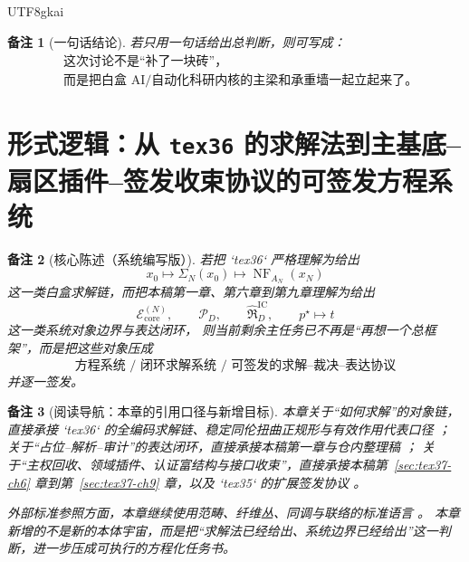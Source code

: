 \documentclass[12pt]{article}
\newtheorem{remark}{备注}[section]
\begin{document}
\begin{CJK*}{UTF8}{gkai}
\begin{remark}[一句话结论]
若只用一句话给出总判断，则可写成：
\[
  \boxed{
    \begin{aligned}
      &\text{这次讨论不是“补了一块砖”，}\\
      &\text{而是把白盒 AI/自动化科研内核的主梁和承重墙一起立起来了。}
    \end{aligned}
  }
\]
\end{remark}

\clearpage

\section{形式逻辑：从 \texttt{tex36} 的求解法到主基底--扇区插件--签发收束协议的可签发方程系统}
\label{sec:tex37-ch11}

\begin{remark}[核心陈述（系统编写版）]
若把 `tex36` 严格理解为给出
\[
  x_0\mapsto \Sigma_N(x_0)\mapsto \operatorname{NF}_{A_N}(x_N)
\]
这一类白盒求解链，而把本稿第一章、第六章到第九章理解为给出
\[
  \mathcal E_{\mathrm{core}}^{(N)},
  \qquad
  \mathcal P_D,
  \qquad
  \widehat{\mathfrak R}_D^{\mathrm{IC}},
  \qquad
  p^\star\mapsto t
\]
这一类系统对象边界与表达闭环，
则当前剩余主任务已不再是“再想一个总框架”，而是把这些对象压成
\[
  \boxed{
    \text{方程系统 / 闭环求解系统 / 可签发的求解--裁决--表达协议}
  }
\]
并逐一签发。
\end{remark}

\begin{remark}[阅读导航：本章的引用口径与新增目标]
本章关于“如何求解”的对象链，直接承接 `tex36` 的全编码求解链、稳定同伦扭曲正规形与有效作用代表口径 \cite{RepoTex36HomotopyTwistBijection}；
关于“占位--解析--审计”的表达闭环，直接承接本稿第一章与仓内整理稿 \cite{RepoTex20SemanticGaugeNormalization,RepoTex21AuditedWrapper,
  RepoTex23SemanticBase}；
关于“主权回收、领域插件、认证富结构与接口收束”，直接承接本稿第~\ref{sec:tex37-ch6} 章到第~\ref{sec:tex37-ch9} 章，以及 `tex35` 的扩展签发协议
  \cite{RepoTex35ExtendedCertificationTower}。

外部标准参照方面，本章继续使用范畴、纤维丛、同调与联络的标准语言 \cite{MacLane1998Categories,Hatcher2002AT,Weibel1994HomologicalAlgebra,
  KobayashiNomizu1963Foundations}。
本章新增的不是新的本体宇宙，而是把“求解法已经给出、系统边界已经给出”这一判断，进一步压成可执行的方程化任务书。
\end{remark}


\end{CJK*}
\end{document}
